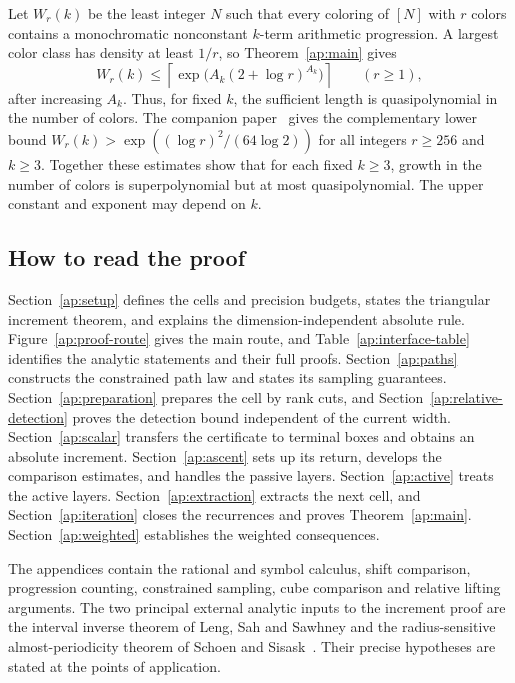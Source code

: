 Let $W_r(k)$ be the least integer $N$ such that every coloring of
$[N]$ with $r$ colors contains a monochromatic nonconstant
$k$-term arithmetic progression. A largest color class has
density at least $1/r$, so Theorem~\ref{ap:main} gives
\begin{equation}\label{ap:coloring}
 W_r(k)\le
 \left\lceil\exp\bigl(A_k(2+\log r)^{A_k}\bigr)\right\rceil
 \qquad(r\ge1),
\end{equation}
after increasing $A_k$. Thus, for fixed $k$, the sufficient
length is quasipolynomial in the number of colors.
The companion paper~\cite[Theorem~7.2]{OpenAIVanDerWaerden2026}
gives the complementary lower bound
$W_r(k)>\exp((\log r)^2/(64\log2))$ for all integers $r\ge256$
and $k\ge3$. Together these estimates show that for each fixed
$k\ge3$, growth in the number of colors is superpolynomial but
at most quasipolynomial. The upper constant and exponent may
depend on $k$.

\subsection{How to read the proof}

Section~\ref{ap:setup} defines the cells and precision budgets,
states the triangular increment theorem, and explains the
dimension-independent absolute rule.
Figure~\ref{ap:proof-route} gives the main route, and
Table~\ref{ap:interface-table} identifies the analytic statements
and their full proofs.
Section~\ref{ap:paths} constructs the constrained path law and
states its sampling guarantees. Section~\ref{ap:preparation}
prepares the cell by rank cuts, and
Section~\ref{ap:relative-detection} proves the detection bound
independent of the current width. Section~\ref{ap:scalar}
transfers the certificate to terminal boxes and obtains an
absolute increment. Section~\ref{ap:ascent} sets up its return,
develops the comparison estimates, and handles the passive
layers. Section~\ref{ap:active} treats the active layers.
Section~\ref{ap:extraction} extracts the next cell, and
Section~\ref{ap:iteration} closes the recurrences and proves
Theorem~\ref{ap:main}. Section~\ref{ap:weighted} establishes the
weighted consequences.

The appendices contain the rational and symbol calculus, shift
comparison, progression counting, constrained sampling, cube
comparison and relative lifting arguments. The two principal
external analytic inputs to the increment proof are the interval inverse theorem of
Leng, Sah and Sawhney and the radius-sensitive almost-periodicity
theorem of Schoen and Sisask~\cite{LSSInverse2024,SchoenSisask2016}.
Their precise hypotheses are stated at the points of application.
